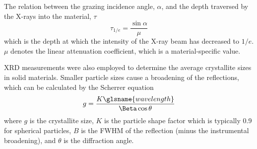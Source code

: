 \documentclass[webedition,openright,titles,swedish,english]{LuaUUThesis}\usepackage[]{graphicx}\usepackage[]{xcolor}
\begin{document}
The relation between the grazing incidence angle, $\alpha$, and the depth
traversed by the X-rays into the material, $\tau$
\begin{equation}\label{eq:xrd-gi}
\tau_{1/e} = \frac{\sin\alpha}{\mu}
\end{equation}
which is the depth at which the intensity of the X-ray beam has decreased
to $1/e$. $\mu$ denotes the linear attenuation coefficient, which is a
material-specific value.

\Gls{XRD} measurements were also employed to determine the average crystallite sizes
in solid materials.
Smaller particle sizes cause a broadening of the reflections, which can be
calculated by the Scherrer equation \cite{Holzwarth2011}
\begin{equation}\label{eq:xrd-scherrer}
g = \frac{K\glsname{wavelength}}{\Beta\cos\theta}
\end{equation}
where $g$ is the crystallite size, $K$ is  the particle shape factor which is
typically \num{0.9} for spherical particles, $B$ is the \gls{FWHM} of the reflection
(minus the instrumental broadening), and $\theta$ is the diffraction angle.

%
\end{document}
